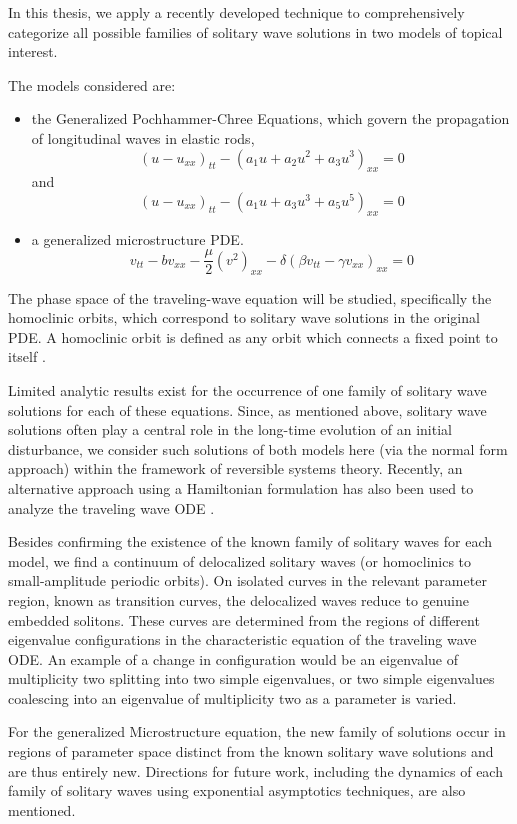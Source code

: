 In this thesis, we apply a recently developed technique to
comprehensively categorize all possible families of solitary wave
solutions in two models of topical interest.

The models considered are:
\begin{itemize}
\item the Generalized Pochhammer-Chree Equations, which  govern the
propagation of longitudinal waves in elastic rods,
\begin{equation}\label{eq:GPC1}
\left( u - u_{xx} \right)_{tt} - \left( a_1 u + a_2 u^2 + a_3 u^3 \right)_{xx} =0  
\end{equation}
and
\begin{equation}  \label{eq:GPC2} 
\left( u - u_{xx} \right)_{tt} - \left( a_1 u + a_3 u^3 + a_5 u^5 \right)_{xx} =0
\end{equation}

\item a generalized microstructure PDE.
\begin{equation}\label{eq:MS}
v_{tt} - b v_{xx} - \frac{\mu}{2} \left( v^2 \right)_{xx} - \delta \left( \beta v_{tt} - \gamma v_{xx}\right)_{xx} = 0 
\end{equation}
\end{itemize}

The phase space of the traveling-wave equation will be studied, specifically the
homoclinic orbits, which correspond to solitary wave solutions in the original
PDE. A homoclinic orbit is defined as any orbit which connects a fixed point to
itself \cite{Strogatz}.

Limited analytic results exist for the occurrence of one family
of  solitary wave solutions for each of these equations. Since, as
mentioned above, solitary wave solutions often play a central role in
the long-time evolution of an initial disturbance, we consider
such solutions of both models here (via the normal form approach)
within the framework of reversible systems theory. Recently, an
alternative approach using a Hamiltonian formulation has also
been used to analyze the traveling wave ODE \cite{LiZhang}.

Besides confirming the existence of the known family of solitary waves for each
model, we find a continuum of delocalized solitary waves (or homoclinics to
small-amplitude periodic orbits).  On isolated curves in the relevant parameter
region, known as transition curves, the delocalized waves reduce to genuine
embedded solitons.  These curves are determined from the regions of different
eigenvalue configurations in the characteristic equation of the traveling wave
ODE. An example of a change in configuration would be an eigenvalue of
multiplicity two splitting into two simple eigenvalues, or two simple
eigenvalues coalescing into an eigenvalue of multiplicity two as a parameter is
varied.

For the generalized Microstructure equation, the new family of solutions occur
in regions of parameter space distinct from the known solitary wave solutions
and are thus entirely new. Directions for future work, including the dynamics of
each family of solitary waves using exponential asymptotics techniques, are also
mentioned.

